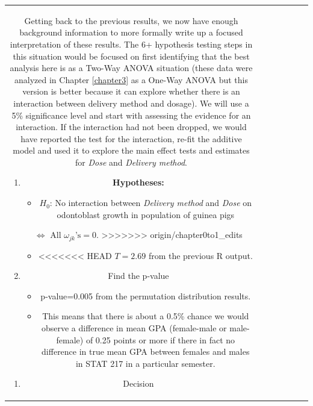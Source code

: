 \documentclass[]{book}
\newenvironment{Shaded}{\begin{snugshade}}{\end{snugshade}}
\providecommand{\tightlist}{%
  \setlength{\itemsep}{0pt}\setlength{\parskip}{0pt}}
\theoremstyle{definition}
\theoremstyle{definition}
\theoremstyle{remark}
\begin{document}
\begin{longtable}[]{@{}ccccccc@{}}
\begin{minipage}[b]{0.10\columnwidth}
\begin{Shaded}
\begin{Highlighting}[]
\begin{Shaded}
\begin{Highlighting}[]
\begin{enumerate}
Getting back to the previous results, we now have enough background
information to more formally write up a focused interpretation of these
results. The 6+ hypothesis testing steps in this situation would be
focused on first identifying that the best analysis here is as a Two-Way
ANOVA situation (these data were analyzed in Chapter \ref{chapter3} as a
One-Way ANOVA but this version is better because it can explore whether
there is an interaction between delivery method and dosage). We will use
a 5\% significance level and start with assessing the evidence for an
interaction. If the interaction had not been dropped, we would have
reported the test for the interaction, re-fit the additive model and
used it to explore the main effect tests and estimates for \emph{Dose}
and \emph{Delivery method}.

\begin{enumerate}
\def\labelenumi{\arabic{enumi}.}
\item
  \textbf{Hypotheses:}

  \begin{itemize}
  \tightlist
  \item
    \(H_0\): No interaction between \emph{Delivery method} and
    \emph{Dose} on odontoblast growth in population of guinea pigs
  \end{itemize}

  \(\Leftrightarrow\) All \(\omega_{jk}\text{'s}=0\).
>>>>>>> origin/chapter0to1_edits

  \begin{itemize}
  \tightlist
  \item
<<<<<<< HEAD
    \(T=2.69\) from the previous R output.
  \end{itemize}
\item
  Find the p-value

  \begin{itemize}
  \item
    p-value=0.005 from the permutation distribution results.
  \item
    This means that there is about a 0.5\% chance we would observe a
    difference in mean GPA (female-male or male-female) of 0.25 points
    or more if there in fact no difference in true mean GPA between
    females and males in STAT 217 in a particular semester.
  \end{itemize}
\end{enumerate}

\newpage

\begin{enumerate}
\def\labelenumi{\arabic{enumi}.}
\setcounter{enumi}{4}
\item
  Decision


\end{enumerate}
\end{enumerate}
\end{Highlighting}
\end{Shaded}
\end{Highlighting}
\end{Shaded}
\end{minipage}
\end{longtable}
\end{document}
